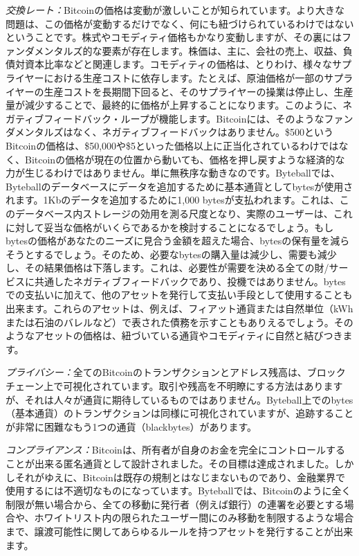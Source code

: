 \documentclass[a4paper, dvipdfmx]{jsarticle}
\begin{document}
{\em 交換レート：}Bitcoinの価格は変動が激しいことが知られています。より大きな問題は、この価格が変動するだけでなく、何にも紐づけられているわけではないということです。株式やコモディティ価格もかなり変動しますが、その裏にはファンダメンタルズ的な要素が存在します。株価は、主に、会社の売上、収益、負債対資本比率などと関連します。コモディティの価格は、とりわけ、様々なサプライヤーにおける生産コストに依存します。たとえば、原油価格が一部のサプライヤーの生産コストを長期間下回ると、そのサプライヤーの操業は停止し、生産量が減少することで、最終的に価格が上昇することになります。このように、ネガティブフィードバック・ループが機能します。Bitcoinには、そのようなファンダメンタルズはなく、ネガティブフィードバックはありません。\$500というBitcoinの価格は、\$50,000や\$5といった価格以上に正当化されているわけではなく、Bitcoinの価格が現在の位置から動いても、価格を押し戻すような経済的な力が生じるわけではありません。単に無秩序な動きなのです。Byteballでは、Byteballのデータベースにデータを追加するために基本通貨としてbytesが使用されます。1Kbのデータを追加するために1,000 bytesが支払われます。これは、このデータベース内ストレージの効用を測る尺度となり、実際のユーザーは、これに対して妥当な価格がいくらであるかを検討することになるでしょう。もしbytesの価格があなたのニーズに見合う金額を超えた場合、bytesの保有量を減らそうとするでしょう。そのため、必要なbytesの購入量は減少し、需要も減少し、その結果価格は下落します。これは、必要性が需要を決める全ての財/サービスに共通したネガティブフィードバックであり、投機ではありません。bytesでの支払いに加えて、他のアセットを発行して支払い手段として使用することも出来ます。これらのアセットは、例えば、フィアット通貨または自然単位（kWhまたは石油のバレルなど）で表された債務を示すこともありえるでしょう。そのようなアセットの価格は、紐づいている通貨やコモディティに自然と結びつきます。

{\em プライバシー：}全てのBitcoinのトランザクションとアドレス残高は、ブロックチェーン上で可視化されています。取引や残高を不明瞭にする方法はありますが、それは人々が通貨に期待しているものではありません。Byteball上でのbytes（基本通貨）のトランザクションは同様に可視化されていますが、追跡することが非常に困難なもう1つの通貨（blackbytes）があります。

{\em コンプライアンス：}Bitcoinは、所有者が自身のお金を完全にコントロールすることが出来る匿名通貨として設計されました。その目標は達成されました。しかしそれがゆえに、Bitcoinは既存の規制とはなじまないものであり、金融業界で使用するには不適切なものになっています。Byteballでは、Bitcoinのように全く制限が無い場合から、全ての移動に発行者（例えば銀行）の連署を必要とする場合や、ホワイトリスト内の限られたユーザー間にのみ移動を制限するような場合まで、譲渡可能性に関してあらゆるルールを持つアセットを発行することが出来ます。
\end{document}
